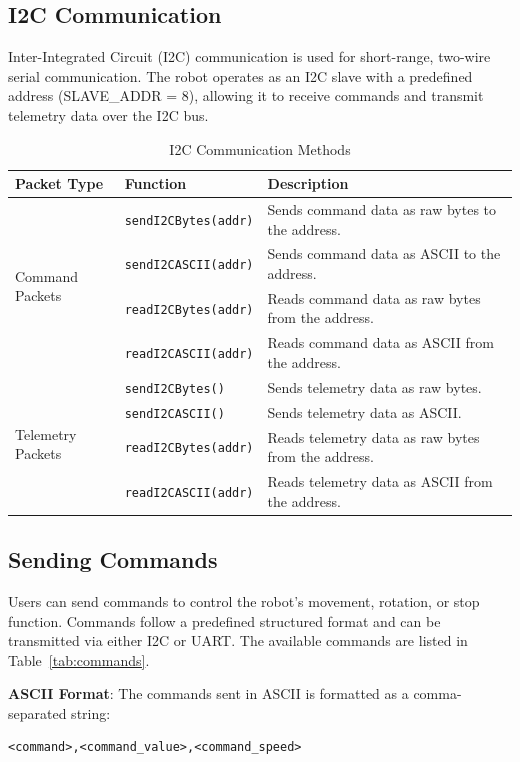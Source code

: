 \subsection{I2C Communication}
Inter-Integrated Circuit (I2C) communication is used for short-range, two-wire serial communication. The robot operates as an I2C slave with a predefined address (SLAVE\_ADDR = 8), allowing it to receive commands and transmit telemetry data over the I2C bus.

\begin{table}[h]
	\centering
	\caption{I2C Communication Methods}
	\begin{tabular}{|l|l|l|}
		\hline
		\textbf{Packet Type} & \textbf{Function} & \textbf{Description} \\ \hline
		\multirow{4}{*}{Command Packets} & \texttt{sendI2CBytes(addr)} & Sends command data as raw bytes to the address. \\ \cline{2-3}
		& \texttt{sendI2CASCII(addr)} & Sends command data as ASCII to the address. \\ \cline{2-3}
		& \texttt{readI2CBytes(addr)} & Reads command data as raw bytes from the address. \\ \cline{2-3}
		& \texttt{readI2CASCII(addr)} & Reads command data as ASCII from the address. \\ \hline
		\multirow{4}{*}{Telemetry Packets} & \texttt{sendI2CBytes()} & Sends telemetry data as raw bytes. \\ \cline{2-3}
		& \texttt{sendI2CASCII()} & Sends telemetry data as ASCII. \\ \cline{2-3}
		& \texttt{readI2CBytes(addr)} & Reads telemetry data as raw bytes from the address. \\ \cline{2-3}
		& \texttt{readI2CASCII(addr)} & Reads telemetry data as ASCII from the address. \\ \hline
	\end{tabular}
	\label{tab:i2c_methods}
\end{table}

\subsection{Sending Commands}
Users can send commands to control the robot’s movement, rotation, or stop function. Commands follow a predefined structured format and can be transmitted via either I2C or UART. The available commands are listed in Table~\ref{tab:commands}.

\textbf{ASCII Format}:
The commands sent in ASCII is formatted as a comma-separated string:
\begin{lstlisting}[]
	<command>,<command_value>,<command_speed>
\end{lstlisting}

